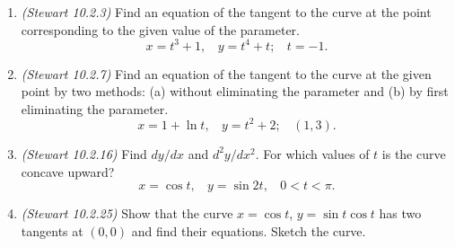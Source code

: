 \documentclass{article}
\begin{document}
\begin{enumerate}
\item {\em (Stewart 10.2.3)} Find an equation of the tangent to the curve at the point corresponding to the given value of the parameter.
\[
x = t^3 + 1, ~~~~ y = t^4 + t; ~~~~ t = -1.
\]

\item {\em (Stewart 10.2.7)} Find an equation of the tangent to the curve at the given point by two methods: (a) without eliminating the parameter and (b) by first eliminating the parameter.
\[
x = 1 + \ln t, ~~~~ y = t^2 + 2; ~~~~ (1, 3).
\]

\item {\em (Stewart 10.2.16)} Find $dy / dx$ and $d^2y / dx^2$. For which values of $t$ is the curve concave upward?
\[
x = \cos t, ~~~~ y = \sin 2t, ~~~~ 0 < t < \pi.
\]

\item {\em (Stewart 10.2.25)} Show that the curve $x = \cos t$, $y = \sin t \cos t$ has two tangents at $(0, 0)$ and find their equations. Sketch the curve.

\end{enumerate}
\end{document}
